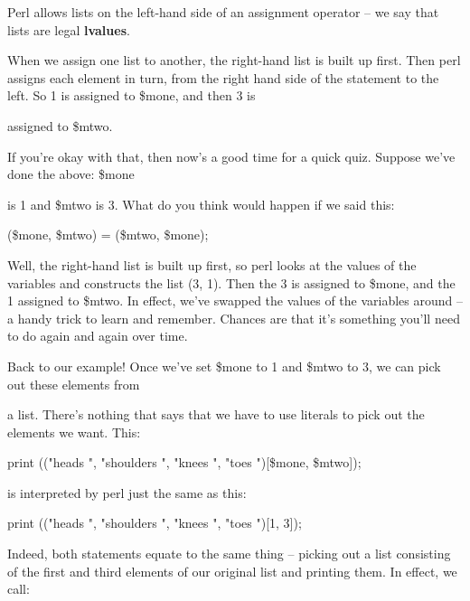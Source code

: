 \documentclass[a4paper,11pt]{book}
\begin{document}
\noindent Perl allows lists on the left-hand side of an assignment operator -- we say that lists are legal \textbf{lvalues}.

\noindent When we assign one list to another, the right-hand list is built up first. Then perl assigns each element in turn, from the right hand side of the statement to the left. So 1 is assigned to \$mone, and then 3 is

\noindent assigned to \$mtwo.

\noindent 

\noindent If you're okay with that, then now's a good time for a quick quiz. Suppose we've done the above: \$mone

\noindent is 1 and \$mtwo is 3. What do you think would happen if we said this:

\noindent 

\noindent 

\noindent (\$mone, \$mtwo) = (\$mtwo, \$mone);

\noindent 

\noindent Well, the right-hand list is built up first, so perl looks at the values of the variables and constructs the list (3, 1). Then the 3 is assigned to \$mone, and the 1 assigned to \$mtwo. In effect, we've swapped the values of the variables around -- a handy trick to learn and remember. Chances are that it's something you'll need to do again and again over time.

\noindent 

\noindent Back to our example! Once we've set \$mone to 1 and \$mtwo to 3, we can pick out these elements from

\noindent a list. There's nothing that says that we have to use literals to pick out the elements we want. This:

\noindent 

\noindent 

\noindent print (("heads ", "shoulders ", "knees ", "toes ")[\$mone, \$mtwo]);

\noindent 

\noindent is interpreted by perl just the same as this:

\noindent 

\noindent 

\noindent print (("heads ", "shoulders ", "knees ", "toes ")[1, 3]);

\noindent 

\noindent Indeed, both statements equate to the same thing -- picking out a list consisting of the first and third elements of our original list and printing them. In effect, we call:
\end{document}
